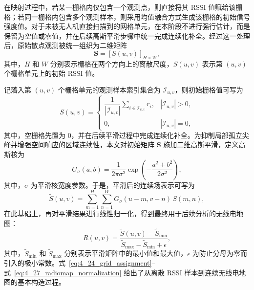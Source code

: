 在映射过程中，若某一栅格内仅包含一个观测点，则直接将其 RSSI 值赋给该栅格；若同一栅格内包含多个观测样本，则采用均值融合方式生成该栅格的初始信号强度值。对于未被无人机直接扫描到的网格单元，在本阶段不进行强行估计，而是保留为空值或零值，并在后续高斯平滑步骤中统一完成连续化补全。经过这一处理后，原始散点观测被统一组织为二维矩阵
{\setlength{\abovedisplayskip}{4pt}
\setlength{\belowdisplayskip}{4pt}
\setlength{\abovedisplayshortskip}{2pt}
\setlength{\belowdisplayshortskip}{4pt}
\begin{equation}
\mathbf{S}
=
\left[
S(u,v)
\right]_{H\times W},
\end{equation}
}
其中，\(H\) 和 \(W\) 分别表示栅格在两个方向上的离散尺度，\(S(u,v)\) 表示第 \((u,v)\) 个栅格单元上的初始 RSSI 值。

记落入第 \((u,v)\) 个栅格单元的观测样本索引集合为 \(\mathcal{I}_{u,v}\)，则初始栅格值可写为
\begin{equation}
S(u,v)=
\begin{cases}
\dfrac{1}{|\mathcal{I}_{u,v}|}\displaystyle\sum_{i\in\mathcal{I}_{u,v}} r_i, & |\mathcal{I}_{u,v}|>0,\\[8pt]
0, & |\mathcal{I}_{u,v}|=0,
\end{cases}
\label{eq:4_24_grid_assignment}
\end{equation}
其中，空栅格先置为 0，并在后续平滑过程中完成连续化补全。为抑制局部孤立尖峰并增强空间响应的区域连续性，本文对初始矩阵 \(\mathbf{S}\) 施加二维高斯平滑，定义高斯核为
\begin{equation}
G_{\sigma}(a,b)=
\frac{1}{2\pi\sigma^{2}}
\exp\!\left(
-\frac{a^{2}+b^{2}}{2\sigma^{2}}
\right),
\label{eq:4_25_gaussian_kernel}
\end{equation}
其中，\(\sigma\) 为平滑核宽度参数。于是，平滑后的连续场表示可写为
\begin{equation}
\tilde{S}(u,v)=
\sum_{m=1}^{H}\sum_{n=1}^{W}
G_{\sigma}(u-m,v-n)\,S(m,n),
\label{eq:4_26_gaussian_smoothing}
\end{equation}
在此基础上，再对平滑结果进行线性归一化，得到最终用于后续分析的无线电地图：
\begin{equation}
R(u,v)=
\frac{\tilde{S}(u,v)-\tilde{S}_{\min}}
{\tilde{S}_{\max}-\tilde{S}_{\min}+\epsilon},
\label{eq:4_27_radiomap_normalization}
\end{equation}
其中，\(\tilde{S}_{\min}\) 和 \(\tilde{S}_{\max}\) 分别表示平滑矩阵中的最小值和最大值，\(\epsilon\) 为防止分母为零而引入的极小常数。式~\eqref{eq:4_24_grid_assignment}--式~\eqref{eq:4_27_radiomap_normalization} 给出了从离散 RSSI 样本到连续无线电地图的基本构造过程。

